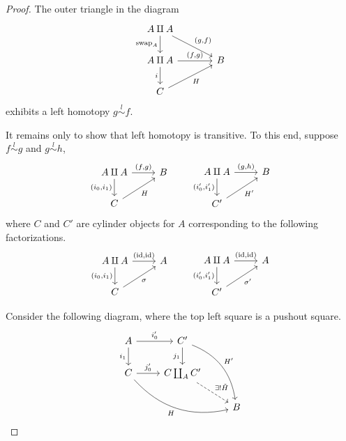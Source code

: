 \documentclass[main.tex]{subfiles}
\begin{document}
\begin{proof}
  The outer triangle in the diagram
  \begin{equation*}
    \begin{tikzcd}[column sep=large]
      A \amalg A
      \arrow[d, swap, "\mathrm{swap}_{A}"]
      \arrow[dr, "{(g, f)}"]
      \\
      A \amalg A
      \arrow[r, "{(f, g)}"]
      \arrow[d, swap, "i"]
      & B
      \\
      C
      \arrow[ur, swap, "H"]
    \end{tikzcd}
  \end{equation*}
  exhibits a left homotopy $g \overset{l}{\sim} f$.

  It remains only to show that left homotopy is transitive. To this end, suppose $f \overset{l}{\sim} g$ and $g \overset{l}{\sim} h$,
  \begin{equation*}
    \begin{tikzcd}
      A \amalg A
      \arrow[r, "{(f, g)}"]
      \arrow[d, swap, "{(i_{0}, i_{1})}"]
      & B
      \\
      C
      \arrow[ur, swap, "H"]
    \end{tikzcd}
    \qquad
    \begin{tikzcd}
      A \amalg A
      \arrow[r, "{(g, h)}"]
      \arrow[d, swap, "{(i_{0}', i_{1}')}"]
      & B
      \\
      C'
      \arrow[ur, swap, "H'"]
    \end{tikzcd}
  \end{equation*}
  where $C$ and $C'$ are cylinder objects for $A$ corresponding to the following factorizations.
  \begin{equation*}
    \begin{tikzcd}
      A \amalg A
      \arrow[r, "{(\id, \id)}"]
      \arrow[d, swap, "{(i_{0}, i_{1})}"]
      & A
      \\
      C
      \arrow[ur, swap, "\sigma"]
    \end{tikzcd}
    \qquad
    \begin{tikzcd}
      A \amalg A
      \arrow[r, "{(\id, \id)}"]
      \arrow[d, swap, "{(i_{0}', i_{1}')}"]
      & A
      \\
      C'
      \arrow[ur, swap, "\sigma'"]
    \end{tikzcd}
  \end{equation*}

  Consider the following diagram, where the top left square is a pushout square.
  \begin{equation*}
    \begin{tikzcd}
      A
      \arrow[r, "i_{0}'"]
      \arrow[d, swap, "i_{1}"]
      & C'
      \arrow[d, swap, "j_{1}"]
      \arrow[ddr, bend left, "H'"]
      \\
      C
      \arrow[r, "j_{0}'"]
      \arrow[drr, swap, bend right, "H"]
      & C \coprod_{A} C'
      \arrow[dr, dashed, "\exists!\tilde{H}"]
      \\
      && B
    \end{tikzcd}
  \end{equation*}


\end{proof}
\end{document}
